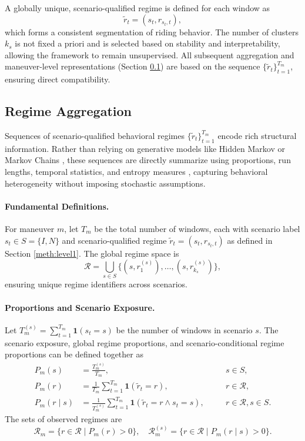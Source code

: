 A globally unique, scenario-qualified regime is defined for each window as
\[
\tilde r_t = (s_t, r_{s_t,t}),
\]
which forms a consistent segmentation of riding behavior. The number of clusters $k_s$ is not fixed a priori and is selected based on stability and interpretability, allowing the framework to remain unsupervised.
All subsequent aggregation and maneuver-level representations (Section \ref{meth:aggregation}) are based on the sequence $\{\tilde r_t\}_{t=1}^{T_m}$, ensuring direct compatibility.


\subsection{Regime Aggregation}
\label{meth:aggregation}

Sequences of scenario-qualified behavioral regimes $\{\tilde r_t\}_{t=1}^{T_m}$ encode rich structural information. Rather than relying on generative models like Hidden Markov or Markov Chains \cite{pentland_modeling_1999}, these sequences are directly summarize using proportions, run lengths, temporal statistics, and entropy measures \cite{vegetabile_estimating_2019}, capturing behavioral heterogeneity without imposing stochastic assumptions.

\paragraph{Fundamental Definitions.}  
For maneuver $m$, let $T_m$ be the total number of windows, each with scenario label $s_t \in S = \{I, N\}$ and scenario-qualified regime $\tilde r_t = (s_t, r_{s_t,t})$ as defined in Section \ref{meth:level1}.  
The global regime space is
\[
\mathcal{R} = \bigcup_{s \in S} \{ (s, r^{(s)}_1), \dots, (s, r^{(s)}_{k_s}) \},
\]
ensuring unique regime identifiers across scenarios.

\paragraph{Proportions and Scenario Exposure.}  
Let $T_m^{(s)} = \sum_{t=1}^{T_m} \mathbf{1}(s_t = s)$ be the number of windows in scenario $s$.  
The scenario exposure, global regime proportions, and scenario-conditional regime proportions can be defined together as
\[
\begin{aligned}
	P_m(s) &= \frac{T_m^{(s)}}{T_m}, &\quad & s \in S, \\
	P_m(r) &= \frac{1}{T_m} \sum_{t=1}^{T_m} \mathbf{1}(\tilde r_t = r), &\quad & r \in \mathcal{R}, \\
	P_m(r \mid s) &= \frac{1}{T_m^{(s)}} \sum_{t=1}^{T_m} \mathbf{1}(\tilde r_t = r \wedge s_t = s), &\quad & r \in \mathcal{R}, s \in S.
\end{aligned}
\]
The sets of observed regimes are
\[
\mathcal{R}_m = \{ r \in \mathcal{R} \mid P_m(r) > 0 \}, \quad
\mathcal{R}_m^{(s)} = \{ r \in \mathcal{R} \mid P_m(r \mid s) > 0 \}.
\]
